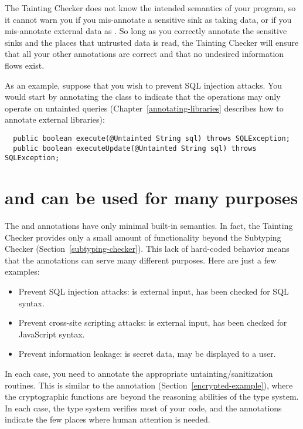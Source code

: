 The Tainting Checker does not know the intended semantics of your program,
so it cannot warn you if you mis-annotate a sensitive sink as taking
 data, or if you mis-annotate external data as
.  So long as you correctly annotate the sensitive sinks
and the places that untrusted data is read, the Tainting Checker will
ensure that all your other annotations are correct and that no undesired
information flows exist.

As an example, suppose that you wish to prevent SQL injection attacks.  You
would start by annotating the
 class to indicate that the
 operations may only operate on untainted queries
(Chapter~\ref{annotating-libraries} describes how to annotate external
libraries):

\begin{Verbatim}
  public boolean execute(@Untainted String sql) throws SQLException;
  public boolean executeUpdate(@Untainted String sql) throws SQLException; 
\end{Verbatim}


\section{ and  can be used for many purposes\label{tainting-many-uses}}

The  and  annotations have only minimal
built-in semantics.  In fact, the Tainting Checker provides only a small
amount of functionality beyond the Subtyping Checker
(Section~\ref{subtyping-checker}).  This lack of hard-coded behavior means that
the annotations can serve many different purposes.  Here are just a few
examples:

\begin{itemize}
\item
  Prevent SQL injection attacks:   is external input,
   has been checked for SQL syntax.
\item
  Prevent cross-site scripting attacks:   is external input,
   has been checked for JavaScript syntax.
\item
  Prevent information leakage:   is secret data, 
   may be displayed to a user.
\end{itemize}

In each case, you need to annotate the appropriate untainting/sanitization
routines.  This is similar to the  annotation
(Section~\ref{encrypted-example}), where the cryptographic functions are
beyond the reasoning abilities of the type system.  In each case, the type
system verifies most of your code, and the 
annotations indicate the few places where human attention is needed.


